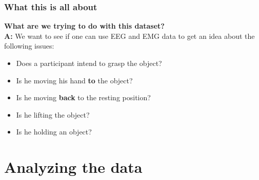 \documentclass{beamer}
\begin{document}
\begin{frame}
	\frametitle{What this is all about}
	\textbf{What are we trying to do with this dataset?}\\
	\textbf{A:} We want to see if one can use EEG and EMG data to get an idea about the following issues: 
	
	\begin{itemize}
		\item Does a participant intend to grasp the object?
		\item Is he moving his hand \textbf{to} the object?
		\item Is he moving \textbf{back} to the resting position?
		\item Is he lifting the object?
		\item Is he holding an object?
	\end{itemize}
	
\end{frame}



\section{Analyzing the data}
\end{document}

